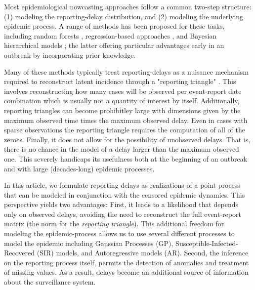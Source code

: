 \documentclass[12pt]{article}
\begin{document}
Most epidemiological nowcasting approaches follow a common two-step structure: (1) modeling the reporting-delay distribution, and (2) modeling the underlying epidemic process. A range of methods has been proposed for these tasks, including random forests \cite{sahai2022machine}, regression-based approaches \cite{donker2011nowcasting, mcgough2020nowcasting, bastos2019modelling}, and Bayesian hierarchical models \cite{johnson2025baseline,gunther2021nowcasting, hohle2014bayesian, chacon2026bayesian}; the latter offering particular advantages early in an outbreak by incorporating prior knowledge. 


Many of these methods typically treat reporting-delays as a nuisance mechanism required to reconstruct latent incidence through a "reporting triangle"  \cite{verrall1989state,  johnson2025baseline, tariq2025nowcast,
overton2023nowcasting, mcgough2020nowcasting}. This involves reconstructing how many cases will be observed per event-report date combination which is usually not a quantity of interest by itself. Additionally, reporting triangles can  become prohibitley large with dimensions given by the maximum observed time times the maximum observed delay. Even in cases with sparse observations the reporting triangle requires the computation of all of the zeroes. Finally, it does not allow for the possibility of unobserved delays. That is, there is no chance in the model of a delay larger than the maximum observed one. This severely handicaps its usefulness both at the beginning of an outbreak and with large (decades-long) epidemic processes. 

In this article, we formulate reporting-delays as realizations of a point process that can be modeled in conjunction with the censored epidemic dynamics. This perspective yields two advantages: First, it leads to a likelihood that depends only on observed delays, avoiding the need to reconstruct the full event-report matrix (the norm for the \textit{reporting triangle}). This additional freedom for modeling the epidemic-process allows us to use several different processes to model the epidemic including Gaussian Processes (GP), Susceptible-Infected-Recovered (SIR) models, and Autoregressive models (AR). Second, the inference on the reporting process itself, permits the detection of anomalies and treatment of missing values. As a result, delays become an additional source of information about the surveillance system.
\end{document}
